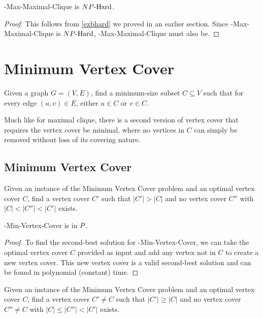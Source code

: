 \begin{theorem}
\exb{}-Max-Maximal-Clique is ${NP\text{-Hard{}}}$.
\end{theorem}
\begin{proof}
This follows from \autoref{exbhard} we proved in an earlier section. Since \exob{}-Max-Maximal-Clique is ${NP\text{-Hard{}}}$, \exb{}-Max-Maximal-Clique must also be.
\end{proof}

\section{Minimum Vertex Cover}
\begin{definition}
Given a graph $G = (V, E)$, find a minimum-size subset $C \subseteq V$ such that for every edge $(u, v) \in E$, either $u \in C$ or $v \in C$.
\end{definition}

Much like for maximal clique, there is a second version of vertex cover that requires the vertex cover be minimal, where no vertices in $C$ can simply be removed without loss of its covering nature.
\subsection{Minimum Vertex Cover}
\begin{definition}
Given an instance of the Minimum Vertex Cover problem and an optimal vertex cover $C$, find a vertex cover $C'$ such that $|C'| > |C|$ and no vertex cover $C''$ with $|C| < |C''| < |C'|$ exists.
\end{definition}

\begin{theorem}
\exob{}-Min-Vertex-Cover is in ${P}{}$.
\end{theorem}
\begin{proof}
To find the second-best solution for \exob{}-Min-Vertex-Cover, we can take the optimal vertex cover $C$ provided as input and add any vertex not in $C$ to create a new vertex cover. This new vertex cover is a valid second-best solution and can be found in polynomial (constant) time.
\end{proof}

\begin{definition}
Given an instance of the Minimum Vertex Cover problem and an optimal vertex cover $C$, find a vertex cover $C' \neq C$ such that $|C'| \geq |C|$ and no vertex cover $C'' \neq C$ with $|C| \leq |C''| < |C'|$ exists.
\end{definition}

